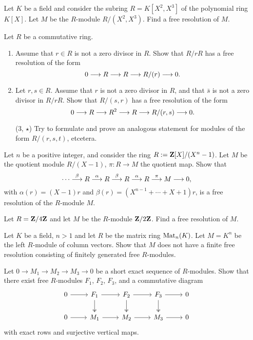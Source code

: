 \begin{exercise}Let $K$ be a field and consider the subring $R=K[X^2,X^3]$ of the polynomial ring $K[X]$. Let $M$ be the $R$-module $R/(X^2,X^3)$. Find a free resolution of $M$.
\end{exercise}


\begin{exercise}
Let $R$ be a commutative ring. 
\begin{enumerate}
\item Assume that $r\in R$ is not a zero divisor in $R$. Show that $R/rR$ has a free resolution of the form
\[
	0 \longrightarrow R \longrightarrow R \longrightarrow R/(r) \longrightarrow 0.
\]
\item Let $r,s\in R$. Assume that $r$ is not a zero divisor in $R$, and that $\bar{s}$ is not a zero divisor in $R/rR$. Show that $R/(s,r)$ has a free resolution of the form
\[
	 0 \longrightarrow R \longrightarrow R^2 \longrightarrow R \longrightarrow R/(r,s) \longrightarrow 0.
\]
\item[(3, $\star$)] Try to formulate and prove an analogous statement for modules of the form $R/(r,s,t)$, etcetera.
\end{enumerate}
\end{exercise}

\begin{exercise}\label{exc:free-resolution-finite-cyclic-group}
Let $n$ be a positive integer, and consider the ring $R := {\mathbf{Z}}[X]/(X^n-1)$. Let $M$ be the quotient module $R/(X-1)$, $\pi \colon R\to M$ the quotient map. Show that
\[
	\cdots \overset{\beta}{\longrightarrow} R \overset{\alpha}{\longrightarrow} R \overset{\beta}{\longrightarrow} R \overset{\alpha}{\longrightarrow} R \overset{\pi}{\longrightarrow} M \longrightarrow 0,
\]
with $\alpha(r) = (X-1)r$ and $\beta(r)=(X^{n-1} + \cdots + X + 1)r$, is a free resolution of the $R$-module $M$. 
\end{exercise}



\begin{exercise}
Let $R={\mathbf{Z}}/4{\mathbf{Z}}$ and let $M$ be the $R$-module ${\mathbf{Z}}/2{\mathbf{Z}}$. Find a free resolution of $M$.
\end{exercise}

\begin{exercise}
Let $K$ be a field, $n>1$ and let $R$ be the matrix ring $\operatorname{Mat}_n(K)$. Let $M=K^n$ be the left $R$-module of column vectors. Show that $M$ does not have a finite free resolution consisting of finitely generated free $R$-modules.
\end{exercise}

\begin{exercise}
Let $0\to M_1\to M_2 \to M_3 \to 0$ be a short exact sequence of $R$-modules. Show that there exist free $R$-modules $F_1$, $F_2$, $F_3$, and a commutative diagram
\[
\begin{tikzcd}
 0 \arrow{r} & F_1 \arrow{r} \arrow[two heads]{d}
 	& F_2 \arrow{r} \arrow[two heads]{d}
	& F_3 \arrow{r} \arrow[two heads]{d} & 0 \\
0 \arrow{r} & M_1 \arrow{r} & M_2  \arrow{r} & M_3 \arrow{r} & 0
\end{tikzcd}
\]
with exact rows and surjective vertical maps.
\end{exercise}

